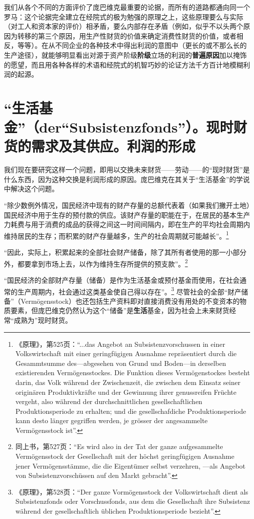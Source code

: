 \documentclass[fontset=fandol, a4paper, 12pt, openright]{ctexbook}
\begin{document}
我们从各个不同的方面评价了庞巴维克最重要的论据，而所有的道路都通向同一个罗马：这个论据完全建立在经院式的极为勉强的原理之上，这些原理要么与实际（对工人和资本家的评价）相矛盾，要么内部存在矛盾（例如，似乎不以头两个原因为转移的第三个原因，用生产性财货的价值来确定消费性财货的价值，或者相反，等等）。在从不同企业的各种技术中得出利润的意图中（更长的或不那么长的生产途径），就能够明显看出对源于资产阶级\textbf{阶级}立场的利润的\textbf{普遍原因}加以掩饰的愿望，而且用各种各样的术语和经院式的机智巧妙的论证方法千方百计地模糊利润的起源。

\section{“生活基金”（der“Subsistenzfonds”）。现时财货的需求及其供应。利润的形成}

我们现在要研究这样一个问题，即用以交换未来财货——劳动——的“现时财货”是什么东西，因为这种交换是利润形成的原因。庞巴维克在其关于“生活基金”的学说中解决这个问题。

“除少数例外情况，国民经济中现有的财产存量的总额代表着（如果我们撇开土地）国民经济中用于生存的预付款的供应。该财产存量的职能在于，在居民的基本生产力耗费与用于消费的成品的获得之间这一时间间隔内，即在生产的平均社会周期内维持居民的生存；而积累的财产存量越多，生产的社会周期就可能越长”。\footnote{《原理》，第525页：“...das Angebot an Subsistenzvorschussen in einer Volkswirtschaft mit einer geringf\"{u}gigen Ausnahme repr\"{a}sentiert durch die Gesammtsumme des—abgesehen von Grund und Boden—in derselben existierenden Verm\"{o}gensstockes. Die Funktion dieses Verm\"{o}genstockes besteht darin, das Volk w\"{a}hrend der Zwischenzeit, die zwischen dem Einsatz seiner origin\"{a}ren Produktivkr\"{a}fte und der Gewinnung ihrer genussreifen Fr\"{u}chte vergeht, also w\"{a}hrend der durchschnittlichen gesellschaftlichen Produktionsperiode zu erhalten; und die gesellschafdiche Produktionsperiode kann desto l\"{a}nger gegriffen werden, je gr\"{o}sser der angesammelte Verm\"{o}gensstock ist”.}

“因此，实际上，积累起来的全部社会财产储备，除了其所有者使用的那一小部分外，都要拿到市场上去，以作为维持生存所提供的预支款”。\footnote{同上书，第527页：“Es wird also in der Tat der ganze aufgesammelte Verm\"{o}gensstock der Gesellschaft mit der h\"{o}chst geringf\"{u}gigen Ausnahme jener Verm\"{o}gensst\"{a}mme, die die Eigent\"{u}mer selbst verzehren, —als Angebot von Subsistenzvorsch\"{u}ssen auf den Markt gebracht”.}

“国民经济的全部财产存量（储备）是作为生活基金或预付基金而使用，在社会通常的生产周期内，社会通过这类基金使自己得以存在”。\footnote{《原理》，第528页：“Der ganze Vorm\"{o}gensstock der Volkswirtschaft dient als Subsistenzfonds oder Vorschussfonds, aus dem die Gesellschaft ihre Subsistenz w\"{a}hrend der gesellschaftlich \"{u}blichen Produktionsperiode bezieht”.} 尽管社会的全部“财产储备”（Verm\"{o}gensstock）也还包括生产资料即对直接消费没有用处的不变资本的物质要素，但庞巴维克仍然认为这个“储备”是\textbf{生活}基金，因为社会上未来财货经常“成熟为”现时财货。
\end{document}
